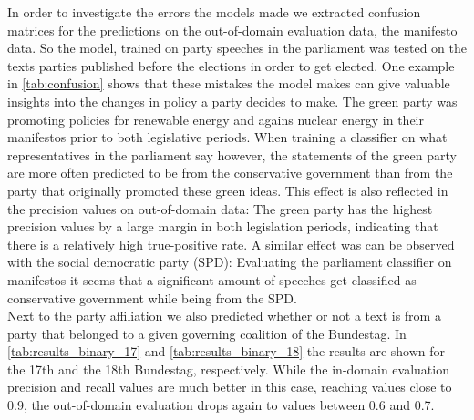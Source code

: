 \documentclass[runningheads,a4paper]{llncs}
\begin{document}
In order to investigate the errors the models made we extracted confusion matrices for the predictions on the out-of-domain evaluation data, the manifesto data. So the model, trained on party speeches in the parliament was tested on the texts parties published before the elections in order to get elected. One example in \autoref{tab:confusion} shows that these mistakes the model makes can give valuable insights into the changes in policy a party decides to make. The green party was promoting policies for renewable energy and agains nuclear energy in their manifestos prior to both legislative periods. When training a classifier on what representatives in the parliament say however, the statements of the green party are more often predicted to be from the conservative government than from the party that originally promoted these green ideas. This effect is also reflected in the precision values on out-of-domain data: The green party has the highest precision values by a large margin in both legislation periods, indicating that there is a relatively high true-positive rate. A similar effect was can be observed with the social democratic party (SPD): Evaluating the parliament classifier on manifestos it seems that a significant amount of speeches get classified as conservative government while being from the SPD. \\

Next to the party affiliation we also predicted whether or not a text is from a party that belonged to a given governing coalition of the Bundestag. In \autoref{tab:results_binary_17} and \autoref{tab:results_binary_18} the results are shown for the 17th and the 18th Bundestag, respectively. While the in-domain evaluation precision and recall values are much better in this case, reaching values close to 0.9, the out-of-domain evaluation drops again to values between 0.6 and 0.7. 
\end{document}

